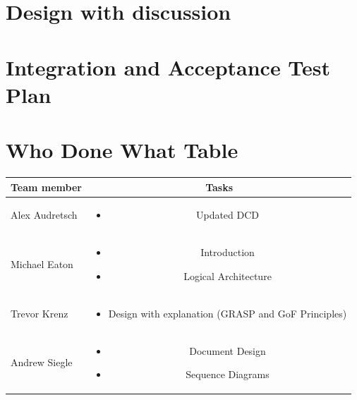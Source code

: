 \documentclass{article}
\begin{document}
\section{Design with discussion}
\newpage
\section{Integration and Acceptance Test Plan}
\newpage
\section{Who Done What Table}
\begin{center}
\begin{tabular}{|l|c|}
\hline
Team member & Tasks \\ \hline
Alex Audretsch & 
\begin{minipage}{.4\textwidth}
\vspace{11pt}
\begin{itemize}
	\item Updated DCD
\end{itemize} 
\end{minipage} \\ \hline
Michael Eaton & 
\begin{minipage}{.4\textwidth}
\vspace{11pt}
\begin{itemize}
	\item Introduction
	\item Logical Architecture
\end{itemize} 
\end{minipage} \\ \hline
Trevor Krenz & 
\begin{minipage}{.4\textwidth}
\vspace{11pt}
\begin{itemize}
	\item Design with explanation (GRASP and GoF Principles)
\end{itemize} 
\end{minipage} \\ \hline
Andrew Siegle & 
\begin{minipage}{.4\textwidth}
\vspace{11pt}
\begin{itemize}
	\item Document Design
	\item Sequence Diagrams
\end{itemize} 
\end{minipage} \\ \hline
\end{tabular}
\end{center}
\end{document}
